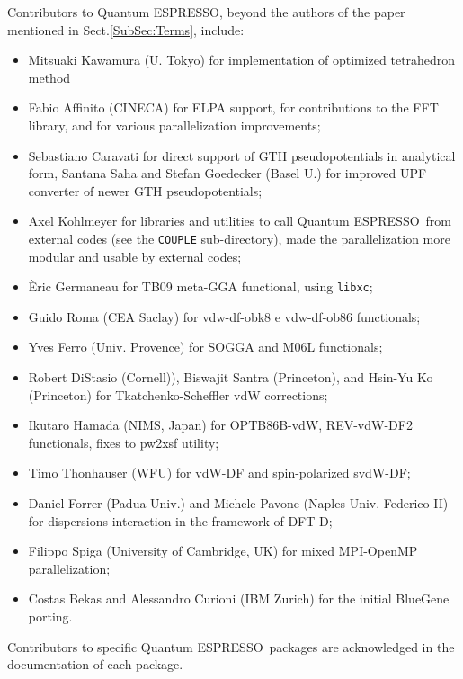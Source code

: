 \documentclass[12pt,a4paper]{article}
\def\qe{{\sc Quantum ESPRESSO}}
\begin{document}
Contributors to \qe, beyond the authors of the paper
mentioned in Sect.\ref{SubSec:Terms}, include:
\begin{itemize}
  \item Mitsuaki Kawamura (U. Tokyo) for implementation of optimized
  tetrahedron method
  \item Fabio Affinito (CINECA) for ELPA support, for contributions
  to the FFT library, and for various parallelization improvements;
  \item Sebastiano Caravati for direct support of GTH pseudopotentials
  in analytical form, Santana Saha and Stefan Goedecker (Basel U.)
  for improved UPF converter of newer GTH pseudopotentials;
  \item Axel Kohlmeyer for libraries and utilities to call \qe\
  from external codes (see the \texttt{COUPLE} sub-directory), made the
  parallelization more modular and usable by external codes;
  \item \`Eric Germaneau for TB09 meta-GGA functional, using \texttt{libxc};
  \item Guido Roma (CEA Saclay) for  vdw-df-obk8  e vdw-df-ob86 functionals; 
  \item Yves Ferro (Univ. Provence) for SOGGA and M06L functionals; 
  \item Robert DiStasio (Cornell)), Biswajit Santra (Princeton), and
    Hsin-Yu Ko (Princeton) for Tkatchenko-Scheffler  vdW corrections;
  \item Ikutaro Hamada (NIMS, Japan) for OPTB86B-vdW, REV-vdW-DF2
    functionals, fixes to pw2xsf utility;
  \item Timo Thonhauser (WFU) for vdW-DF and spin-polarized svdW-DF;
  \item Daniel Forrer (Padua Univ.) and Michele Pavone
  (Naples Univ. Federico II) for dispersions interaction in the
  framework of DFT-D;
  \item Filippo Spiga (University of Cambridge, UK) for mixed MPI-OpenMP parallelization;
  \item Costas Bekas and Alessandro Curioni (IBM Zurich) for the initial
  BlueGene porting.
\end{itemize}

Contributors to specific \qe\ packages are acknowledged in the
documentation of each package.
\end{document}
